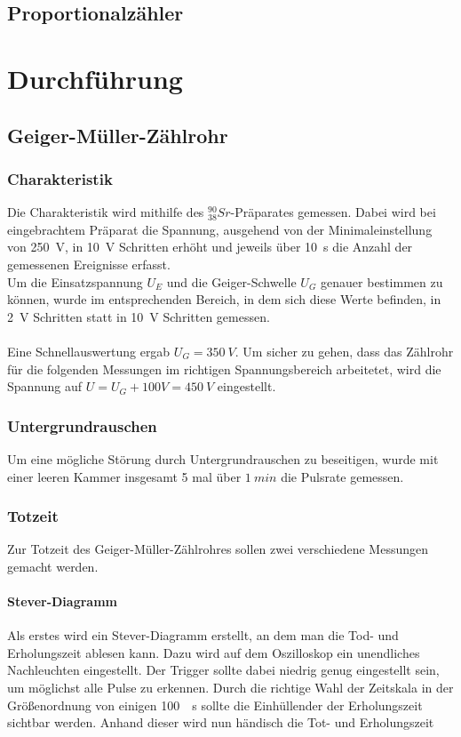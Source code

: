 \documentclass[12pt,a4paper]{article}
\begin{document}
\subsection{Proportionalzähler}

\section{Durchführung}
\subsection{Geiger-Müller-Zählrohr}
\subsubsection{Charakteristik}
Die Charakteristik wird mithilfe des $_{38}^{90}Sr$-Präparates gemessen. Dabei wird bei eingebrachtem Präparat die Spannung, ausgehend von der Minimaleinstellung von \SI{250}{V}, in \SI{10}{V} Schritten erhöht und jeweils über \SI{10}{s} die Anzahl der gemessenen Ereignisse erfasst.\\
Um die Einsatzspannung $U_E$ und die Geiger-Schwelle $U_G$ genauer bestimmen zu können, wurde im entsprechenden Bereich, in dem sich diese Werte befinden, in \SI{2}{V} Schritten statt in \SI{10}{V} Schritten gemessen.\\
\\Eine Schnellauswertung ergab $U_G = \SI{350}{V}$. Um sicher zu gehen, dass das Zählrohr für die folgenden Messungen im richtigen Spannungsbereich arbeitetet, wird die Spannung auf $U = U_G + 100V = \SI{450}{V}$ eingestellt.

\subsubsection{Untergrundrauschen}
Um eine mögliche Störung durch Untergrundrauschen zu beseitigen, wurde mit einer leeren Kammer insgesamt 5 mal über $\SI{1}{min}$ die Pulsrate gemessen.

\subsubsection{Totzeit}
Zur Totzeit des Geiger-Müller-Zählrohres sollen zwei verschiedene Messungen gemacht werden.
\paragraph{Stever-Diagramm}
Als erstes wird ein Stever-Diagramm erstellt, an dem man die Tod- und Erholungszeit ablesen kann. Dazu wird auf dem Oszilloskop ein unendliches Nachleuchten eingestellt. Der Trigger sollte dabei niedrig genug eingestellt sein, um möglichst alle Pulse zu erkennen. Durch die richtige Wahl der Zeitskala in der Größenordnung von einigen \SI{100}{\mu s} sollte die Einhüllender der Erholungszeit sichtbar werden. Anhand dieser wird nun händisch die Tot- und Erholungszeit 
\end{document}
